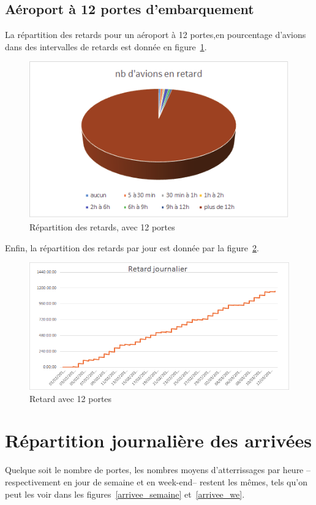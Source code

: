  \subsection{Aéroport à 12 portes d'embarquement}
La répartition des retards pour un aéroport à 12 portes,en pourcentage d'avions dans des intervalles de retards est donnée en figure~\ref{retard_camenbert_12}.
  \graphicspath{{donnees/graph_90jours/12portes/}}
\begin{figure}[H]
\centering \includegraphics[scale=0.6]{retard_avions.png}
 \caption{\label{retard_camenbert_12} Répartition des retards, avec 12 portes} 
\end{figure}
 
Enfin, la répartition des retards par jour est donnée par la figure~\ref{retard_jour_12}.
\begin{figure}[H]
\centering \includegraphics[scale=0.6]{retard_jour.png}
 \caption{\label{retard_jour_12} Retard avec 12 portes} 
\end{figure}
 
\section{Répartition journalière des arrivées}
Quelque soit le nombre de portes, les nombres moyens d'atterrissages par heure -- respectivement en jour de semaine et en week-end-- restent les mêmes, tels qu'on peut les voir dans les figures~\ref{arrivee_semaine} et~\ref{arrivee_we}.

